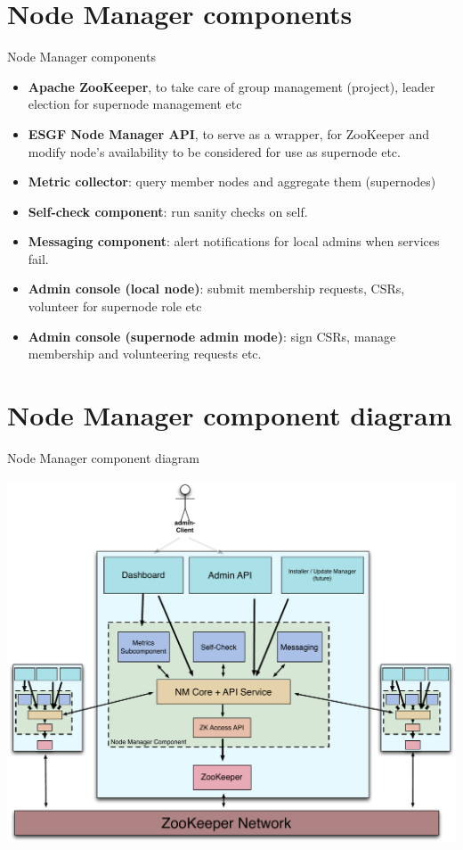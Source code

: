 \documentclass{beamer}
\begin{document}
\section{Node Manager components}
\begin{frame}{Node Manager components}
\begin{itemize}
\item \textbf{Apache ZooKeeper}, to take care of group management (project), leader election for supernode management etc
\item \textbf{ESGF Node Manager API}, to serve as a wrapper, for ZooKeeper and modify node's availability to be considered for use as supernode etc.
\item \textbf{Metric collector}: query member nodes and aggregate them (supernodes)
\item \textbf{Self-check component}: run sanity checks on self.
\item \textbf{Messaging component}: alert notifications for local admins when services fail.
\item \textbf{Admin console (local node)}: submit membership requests, CSRs, volunteer for supernode role etc
\item \textbf{Admin console (supernode admin mode)}: sign CSRs, manage membership and volunteering requests etc. 
\end{itemize}
\end{frame}

\section{Node Manager component diagram}
\begin{frame}{Node Manager component diagram}
\begin{center}
\includegraphics[scale=0.3]{NM-design.pdf}
\end{center}
\end{frame}
\end{document}
